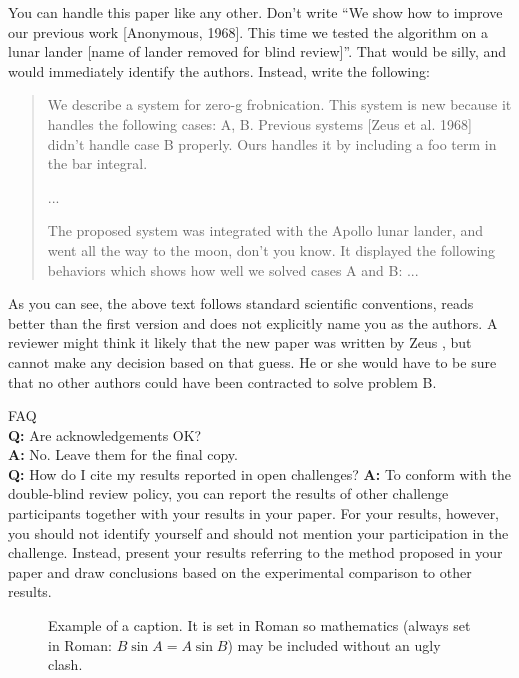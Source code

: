 \documentclass[10pt,twocolumn,letterpaper]{article}
\begin{document}
You can handle this paper like any other.  Don't write ``We show how to
improve our previous work [Anonymous, 1968].  This time we tested the
algorithm on a lunar lander [name of lander removed for blind review]''.
That would be silly, and would immediately identify the authors. Instead,
write the following:
\begin{quotation}
\noindent
   We describe a system for zero-g frobnication.  This
   system is new because it handles the following cases:
   A, B.  Previous systems [Zeus et al. 1968] didn't
   handle case B properly.  Ours handles it by including
   a foo term in the bar integral.

   ...

   The proposed system was integrated with the Apollo
   lunar lander, and went all the way to the moon, don't
   you know.  It displayed the following behaviors
   which shows how well we solved cases A and B: ...
\end{quotation}
As you can see, the above text follows standard scientific conventions,
reads better than the first version and does not explicitly name you as
the authors.  A reviewer might think it likely that the new paper was
written by Zeus \etal, but cannot make any decision based on that guess.
He or she would have to be sure that no other authors could have been
contracted to solve problem B.
\medskip

\noindent
FAQ\medskip\\
{\bf Q:} Are acknowledgements OK?\\
{\bf A:} No.  Leave them for the final copy.\medskip\\
{\bf Q:} How do I cite my results reported in open challenges?
{\bf A:} To conform with the double-blind review policy, you can report the results of other challenge participants together with your results in your paper. For your results, however, you should not identify yourself and should not mention your participation in the challenge. Instead, present your results referring to the method proposed in your paper and draw conclusions based on the experimental comparison to other results.\medskip\\

\begin{figure}[t]
\begin{center}
\fbox{\rule{0pt}{2in} \rule{0.9\linewidth}{0pt}}
\end{center}
   \caption{Example of a caption.  It is set in Roman so mathematics
   (always set in Roman: $B \sin A = A \sin B$) may be included without an
   ugly clash.}
\label{fig:long}
\label{fig:onecol}
\end{figure}
\end{document}
